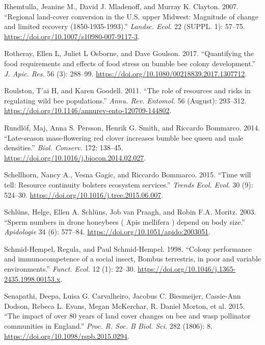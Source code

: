 \documentclass[11pt,]{article}
\begin{document}
\leavevmode\hypertarget{ref-Rhemtulla2007}{}%
Rhemtulla, Jeanine M., David J. Mladenoff, and Murray K. Clayton. 2007.
``Regional land-cover conversion in the U.S. upper Midwest: Magnitude of
change and limited recovery (1850-1935-1993).'' \emph{Landsc. Ecol.} 22
(SUPPL. 1): 57--75. \url{https://doi.org/10.1007/s10980-007-9117-3}.

\leavevmode\hypertarget{ref-Rotheray2017}{}%
Rotheray, Ellen L, Juliet L Osborne, and Dave Goulson. 2017.
``Quantifying the food requirements and effects of food stress on bumble
bee colony development.'' \emph{J. Apic. Res.} 56 (3): 288--99.
\url{https://doi.org/10.1080/00218839.2017.1307712}.

\leavevmode\hypertarget{ref-Roulston2011}{}%
Roulston, T'ai H, and Karen Goodell. 2011. ``The role of resources and
risks in regulating wild bee populations.'' \emph{Annu. Rev. Entomol.}
56 (August): 293--312.
\url{https://doi.org/10.1146/annurev-ento-120709-144802}.

\leavevmode\hypertarget{ref-Rundlof2014}{}%
Rundlöf, Maj, Anna S. Persson, Henrik G. Smith, and Riccardo Bommarco.
2014. ``Late-season mass-flowering red clover increases bumble bee queen
and male densities.'' \emph{Biol. Conserv.} 172: 138--45.
\url{https://doi.org/10.1016/j.biocon.2014.02.027}.

\leavevmode\hypertarget{ref-Schellhorn2015c}{}%
Schellhorn, Nancy A., Vesna Gagic, and Riccardo Bommarco. 2015. ``Time
will tell: Resource continuity bolsters ecosystem services.''
\emph{Trends Ecol. Evol.} 30 (9): 524--30.
\url{https://doi.org/10.1016/j.tree.2015.06.007}.

\leavevmode\hypertarget{ref-Schluns2003}{}%
Schlüns, Helge, Ellen A. Schlüns, Job van Praagh, and Robin F.A. Moritz.
2003. ``Sperm numbers in drone honeybees ( Apis mellifera ) depend on
body size.'' \emph{Apidologie} 34 (6): 577--84.
\url{https://doi.org/10.1051/apido:2003051}.

\leavevmode\hypertarget{ref-Schmid-Hempel1998a}{}%
Schmid-Hempel, Regula, and Paul Schmid-Hempel. 1998. ``Colony
performance and immunocompetence of a social insect, Bombus terrestris,
in poor and variable environments.'' \emph{Funct. Ecol.} 12 (1): 22--30.
\url{https://doi.org/10.1046/j.1365-2435.1998.00153.x}.

\leavevmode\hypertarget{ref-Senapathi2015a}{}%
Senapathi, Deepa, Luisa G. Carvalheiro, Jacobus C. Biesmeijer,
Cassie-Ann Dodson, Rebeca L. Evans, Megan McKerchar, R. Daniel Morton,
et al. 2015. ``The impact of over 80 years of land cover changes on bee
and wasp pollinator communities in England.'' \emph{Proc. R. Soc. B
Biol. Sci.} 282 (1806): 8. \url{https://doi.org/10.1098/rspb.2015.0294}.
\end{document}
